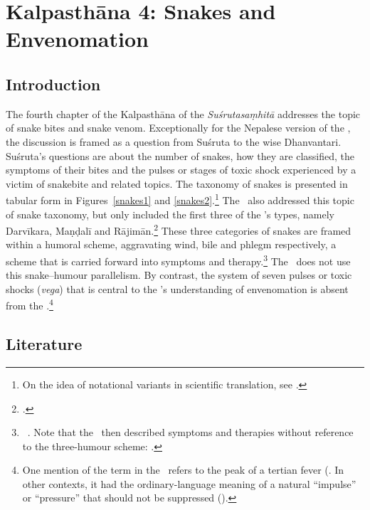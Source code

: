 \chapter{Kalpasthāna 4: Snakes and Envenomation}

\section{Introduction} 

The fourth chapter of the Kalpasthāna of the \emph{Suśrutasaṃhitā}
addresses the topic of snake bites and snake venom. Exceptionally for
the Nepalese version of the \SS, the discussion is framed as a
question from Suśruta to the wise Dhanvantari.  Suśruta's questions
are about the number of snakes, how they are classified, the symptoms
of their bites and the pulses or stages of toxic shock experienced by
a victim of snakebite and related topics.  The taxonomy of snakes is
presented in tabular form in Figures~\ref{snakes1} and
\ref{snakes2}.\footnote{On the idea of notational variants in
    scientific translation, see
    \cites{elsh-2008}{saru-2016}[81--83]{wuja-2021}.} The \CS\ also
    addressed this topic of snake taxonomy, but only included the first
    three of the \SS's types, namely Darvīkara, Maṇḍalī and
    Rājimān.\footnote{.}  These three categories
        of snakes are framed within a humoral scheme, aggravating wind, bile
        and phlegm respectively, a scheme that is carried forward into
        symptoms and therapy.\footnote{\CS\ .  Note
            that the \CS\ then described symptoms and therapies without 
            reference
            to the three-humour scheme: .} The 
            \SS\
            does not use this snake--humour parallelism.  By contrast, the system
            of seven pulses or toxic shocks (\emph{vega}) that is central to the
            \SS's understanding of envenomation is absent from the
            \CS.\footnote{One mention of the term in the \CS\ refers to the peak
                of a tertian fever (\Ca{6.3.70}{404}. In other contexts, it had the
                ordinary-language meaning of a natural “impulse” or “pressure” 
                that
                should not be suppressed ().}
    

\section{Literature} 

